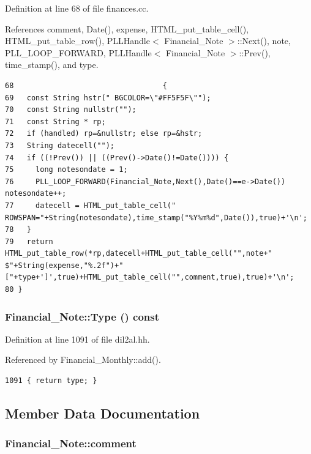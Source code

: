 Definition at line 68 of file finances.cc.

References comment, Date(), expense, HTML\_\-put\_\-table\_\-cell(), HTML\_\-put\_\-table\_\-row(), PLLHandle$<$ Financial\_\-Note $>$::Next(), note, PLL\_\-LOOP\_\-FORWARD, PLLHandle$<$ Financial\_\-Note $>$::Prev(), time\_\-stamp(), and type.



\footnotesize\begin{verbatim}68                                  {
69   const String hstr(" BGCOLOR=\"#FF5F5F\"");
70   const String nullstr("");
71   const String * rp;
72   if (handled) rp=&nullstr; else rp=&hstr;
73   String datecell("");
74   if ((!Prev()) || ((Prev()->Date()!=Date()))) {
75     long notesondate = 1;
76     PLL_LOOP_FORWARD(Financial_Note,Next(),Date()==e->Date()) notesondate++;
77     datecell = HTML_put_table_cell(" ROWSPAN="+String(notesondate),time_stamp("%Y%m%d",Date()),true)+'\n';
78   }
79   return HTML_put_table_row(*rp,datecell+HTML_put_table_cell("",note+" $"+String(expense,"%.2f")+" ["+type+']',true)+HTML_put_table_cell("",comment,true),true)+'\n';
80 }
\end{verbatim}\normalsize 
{}
\subsubsection{ Financial\_\-Note::Type () const\hspace{0.3cm}{\tt  [inline]}}\label{classFinancial__Note_a8}




Definition at line 1091 of file dil2al.hh.

Referenced by Financial\_\-Monthly::add().



\footnotesize\begin{verbatim}1091 { return type; }
\end{verbatim}\normalsize 


\subsection{Member Data Documentation}
\subsubsection{ Financial\_\-Note::comment\hspace{0.3cm}{\tt  [protected]}}\label{classFinancial__Note_n5}




